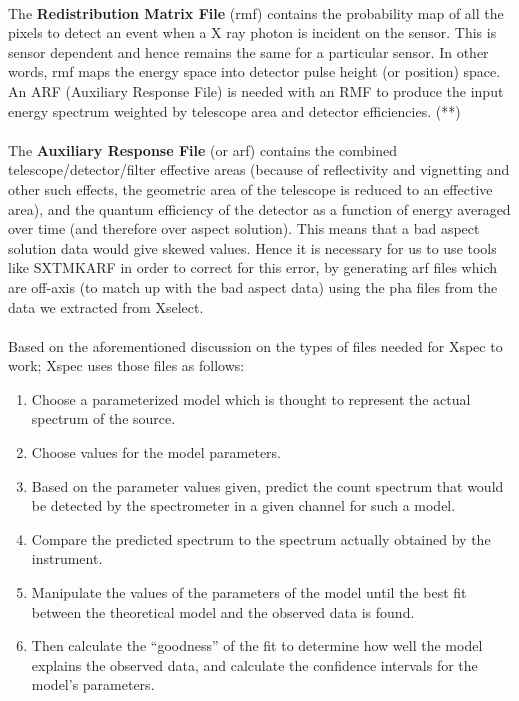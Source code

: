 \documentclass[a4paper,twoside]{report}
\numberwithin{equation}{section}
\begin{document}
\paragraph{}
The \textbf{Redistribution Matrix File} (rmf) contains the probability map of all the pixels to detect an event when a X ray photon is incident on the sensor. This is sensor dependent and hence remains the same for a particular sensor. In other words, rmf maps the energy space into detector pulse height (or position) space. An ARF (Auxiliary Response File) is needed with an RMF to produce the input energy spectrum  weighted by telescope area and detector efficiencies. (**)
\paragraph{}
The \textbf{Auxiliary Response File} (or arf) contains the combined telescope/detector/filter effective areas (because of reflectivity and vignetting and other such effects, the geometric area of the telescope is reduced to an effective area), and the quantum efficiency of the detector as a function of energy averaged over time (and therefore over aspect solution). This means that a bad aspect solution data would give skewed values. Hence it is necessary for us to use tools like SXTMKARF in order to correct for this error, by generating arf files which are off-axis (to match up with the bad aspect data) using the pha files from the data we extracted from Xselect. 
\paragraph{}
Based on the aforementioned discussion on the types of files needed for Xspec to work; Xspec uses those files as follows:
\begin{enumerate}
\item Choose a parameterized model which is thought to represent the actual spectrum of the source.
\item Choose values for the model parameters. 
\item Based on the parameter values given, predict the count spectrum that would be detected by the spectrometer in a given channel for such a model.
\item Compare the predicted spectrum to the spectrum actually obtained by the instrument.
\item Manipulate the values of the parameters of the model until the best fit between the theoretical model and the observed data is found.
\item Then calculate the “goodness” of the fit to determine how well the model explains the observed data, and calculate the confidence intervals for the model’s parameters.
\end{enumerate}
\end{document}
